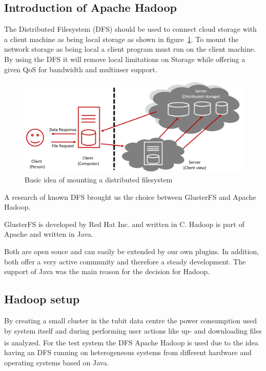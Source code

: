 \subsection{Introduction of Apache Hadoop}

The Distributed Filesystem (DFS) should be used to connect cloud storage with a client machine as being local storage as shown in figure~\ref{fig:dfs_example}. To mount the network storage as being local a client program must run on the client machine. By using the DFS it will remove local limitations on Storage while offering a given QoS for bandwidth and multiuser support.


\begin{figure}
	\centering
	\includegraphics[width=1\linewidth]{img/dfs_example.png}
	\caption{Basic idea of mounting a distributed filesystem}
	\label{fig:dfs_example}
\end{figure}

A research of known DFS brought us the choice between GlusterFS and Apache Hadoop.

GlusterFS is developed by Red Hat Inc. and written in C. Hadoop is part of Apache and written in Java.

Both are open souce and can easily be extended by our own plugins. In addition, both offer a very active community and therefore a steady development. The support of Java was the main reason for the decision for Hadoop.


\subsection{Hadoop setup}

By creating a small cluster in the tubit data centre the power consumption used by system itself and during performing user actions like up- and downloading files is analyzed. For the test system the DFS Apache Hadoop\textsuperscript{\textregistered} is used due to the idea having an DFS running on heterogeneous systems from different hardware and operating systems based on Java. 

